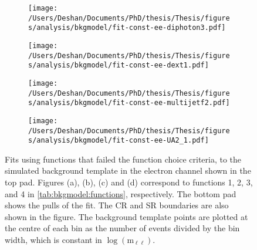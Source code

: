 \begin{figure}[h!]
    \centering
    \begin{subfigure}[b]{0.49\textwidth}
        \centering
        \texttt{[image: /Users/Deshan/Documents/PhD/thesis/Thesis/figures/analysis/bkgmodel/fit-const-ee-diphoton3.pdf]}
        \caption{}
        \label{fig:bkgmodel:fitstoMC3}
    \end{subfigure}
    \begin{subfigure}[b]{0.49\textwidth}
        \centering
        \texttt{[image: /Users/Deshan/Documents/PhD/thesis/Thesis/figures/analysis/bkgmodel/fit-const-ee-dext1.pdf]}
        \caption{}
        \label{fig:bkgmodel:fitstoMC4}
    \end{subfigure}
    \begin{subfigure}[b]{0.49\textwidth}
        \centering
        \texttt{[image: /Users/Deshan/Documents/PhD/thesis/Thesis/figures/analysis/bkgmodel/fit-const-ee-multijetf2.pdf]}
        \caption{}
        \label{fig:bkgmodel:fitstoMC5}
    \end{subfigure}
    \begin{subfigure}[b]{0.49\textwidth}
        \centering
        \texttt{[image: /Users/Deshan/Documents/PhD/thesis/Thesis/figures/analysis/bkgmodel/fit-const-ee-UA2\_1.pdf]}
        \caption{}
        \label{fig:bkgmodel:fitstoMC6}
    \end{subfigure}
    \caption[Fits to the simulated background template in the electron and muon channels using functions that did not pass the selection criteria]{Fits using functions that failed the function choice criteria, to the simulated background template in the electron channel shown in the top pad. Figures (a), (b), (c) and (d) correspond to functions 1, 2, 3, and 4 in \cref{tab:bkgmodel:functions}, respectively. The bottom pad shows the pulls of the fit. The CR and SR boundaries are also shown in the figure. The background template points are plotted at the centre of each bin as the number of events divided by the bin width, which is constant in $\log{(\text{m}_{\ell\ell})}$.}
    \label{fig:bkgmodel:badfitstomc}
\end{figure}
\clearpage

